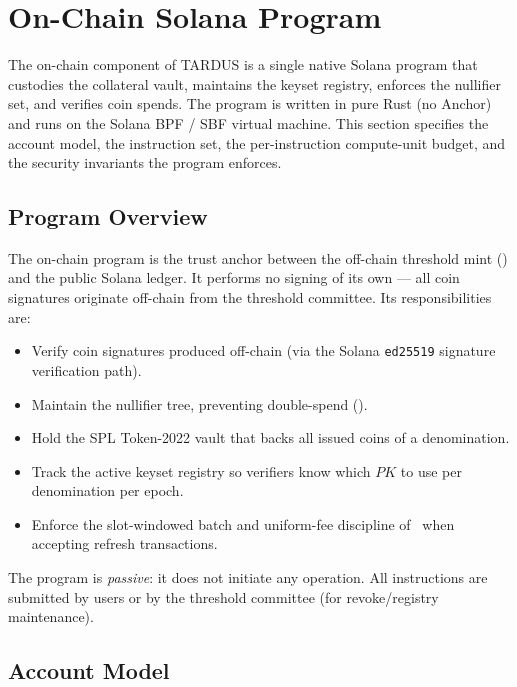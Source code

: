 \section{On-Chain Solana Program}
\label{sec:onchain}

The on-chain component of TARDUS is a single native Solana program that custodies the collateral vault, maintains the keyset registry, enforces the nullifier set, and verifies coin spends. The program is written in pure Rust (no Anchor) and runs on the Solana BPF / SBF virtual machine. This section specifies the account model, the instruction set, the per-instruction compute-unit budget, and the security invariants the program enforces.

\subsection{Program Overview}
\label{sec:onchain-overview}

The on-chain program is the trust anchor between the off-chain threshold mint () and the public Solana ledger. It performs no signing of its own --- all coin signatures originate off-chain from the threshold committee. Its responsibilities are:

\begin{itemize}[leftmargin=2em,itemsep=0pt]
  \item Verify coin signatures produced off-chain (via the Solana \texttt{ed25519} signature verification path).
  \item Maintain the nullifier tree, preventing double-spend ().
  \item Hold the SPL Token-2022 vault that backs all issued coins of a denomination.
  \item Track the active keyset registry so verifiers know which $PK$ to use per denomination per epoch.
  \item Enforce the slot-windowed batch and uniform-fee discipline of~ when accepting refresh transactions.
\end{itemize}

The program is \emph{passive}: it does not initiate any operation. All instructions are submitted by users or by the threshold committee (for revoke/registry maintenance).

\subsection{Account Model}
\label{sec:onchain-accounts}

